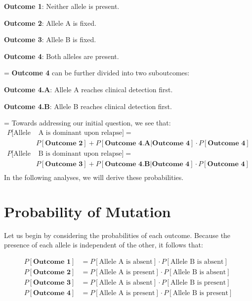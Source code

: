 \documentclass{article}
\begin{document}
\begin{description}
\item{\textbf{Outcome 1}: Neither allele is present.}
\item{\textbf{Outcome 2}: Allele A is fixed.}
\item{\textbf{Outcome 3}: Allele B is fixed.}
\item{\textbf{Outcome 4}: Both alleles are present.}
\end{description}

\parskip = \baselineskip
\textbf{Outcome 4} can be further divided into two suboutcomes:
\begin{description}
\item{\textbf{Outcome 4.A}: Allele A reaches clinical detection first.}
\item{\textbf{Outcome 4.B}: Allele B reaches clinical detection first.}
\end{description}

\parskip = \baselineskip
Towards addressing our initial question, we see that:
\begin{equation}
\begin{split}
P[\text{Allele} & \text{ A is dominant upon relapse}] = \\ &P[\textbf{Outcome 2}] + P[\textbf{Outcome 4.A}|\textbf{Outcome 4}]\cdot P[\textbf{Outcome 4}] \\
P[\text{Allele} & \text{ B is dominant upon relapse}] = \\ &P[\textbf{Outcome 3}] + P[\textbf{Outcome 4.B}|\textbf{Outcome 4}]\cdot P[\textbf{Outcome 4}] \\
\end{split}
\end{equation}
In the following analyses, we will derive these probabilities.

\section{Probability of Mutation}

Let us begin by considering the probabilities of each outcome.  Because the presence of each allele is independent of the other, it follows that:

\begin{equation}
\begin{split}
P[\textbf{Outcome 1}] & = P[\text{Allele A is absent}] \cdot P[\text{Allele B is absent}] \\
P[\textbf{Outcome 2}] & = P[\text{Allele A is present}] \cdot P[\text{Allele B is absent}] \\
P[\textbf{Outcome 3}] & = P[\text{Allele A is absent}] \cdot P[\text{Allele B is present}] \\
P[\textbf{Outcome 4}] & = P[\text{Allele A is present}] \cdot P[\text{Allele B is present}]
\end{split}
\end{equation}
\end{document}
